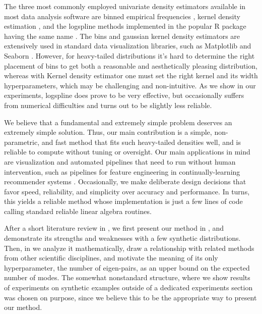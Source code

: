 \documentclass[10pt]{article} %
\begin{document}
The three most commonly employed univariate density estimators available in most data analysis software are binned empirical frequencies \citep{binning_pearson},  kernel density estimation \citep{kde_parzen,kde_rosenblatt}, and the logspline methods \citep{KooperbergStone1991,StoneHansenKooperbergTruong1997} implemented in the popular R package having the same name \citep{logsplineCRAN}. The bins and gaussian kernel density estimators are extensively used in standard data visualization libraries, such as Matplotlib \citep{matplotlib} and Seaborn \citep{seaborn}. However, for heavy-tailed distributions it's hard to determine the right placement of bins to get both a reasonable and aesthetically pleasing distribution, whereas with Kernel density estimator one must set the right kernel and its width hyperparameters, which may be challenging and non-intuitive. As we show in our experiments, logspline does prove to be very effective, but occasionally suffers from numerical difficulties and turns out to be slightly less reliable.

We believe that a fundamental and extremely simple problem deserves an extremely simple solution. Thus, our main contribution is a simple, non-parametric, and fast method that fits such heavy-tailed densities well, and is reliable to compute without tuning or oversight. Our main applications in mind are visualization and automated pipelines that need to run without human intervention, such as pipelines for feature engineering in continually-learning recommender systems \citep{offset_adaptive}. Occasionally, we make deliberate design decisions that favor speed, reliability, and simplicity over accuracy and performance. In turns, this yields a reliable method whose implementation is just a few lines of code calling standard reliable linear algebra routines.

After a short literature review in , we first present our method in , and demonstrate its strengths and weaknesses with a few synthetic distributions. Then, in  we analyze it mathematically, draw a relationship with related methods from other scientific disciplines, and motivate the meaning of its only hyperparameter, the number of eigen-pairs, as an upper bound on the expected number of modes. The somewhat nonstandard structure, where we show results of experiments on synthetic examples outside of a dedicated experiments section was chosen on purpose, since we believe this to be the appropriate way to present our method.
\end{document}
